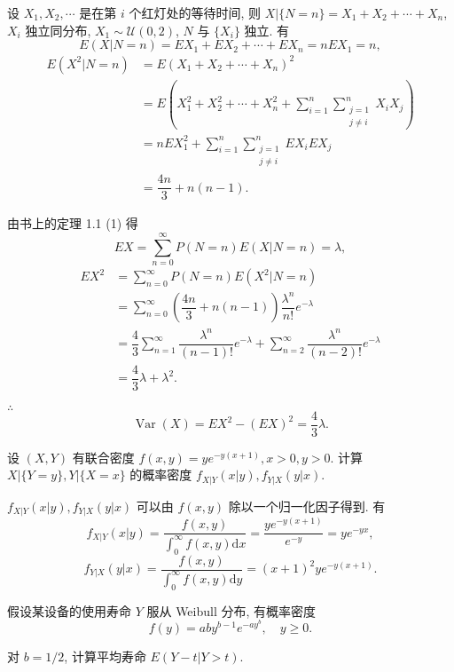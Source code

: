 \documentclass{ctexart}
\begin{document}
\begin{solution}
    设 $X_1,X_2,\cdots$ 是在第 $i$ 个红灯处的等待时间, 则 $X|\{N=n\}=X_1+X_2+\cdots+X_n$, $X_i$ 独立同分布, $X_1\sim\mathcal{U}(0,2)$, $N$ 与 $\{X_i\}$ 独立. 有
    \[E(X|N=n)=EX_1+EX_2+\cdots+EX_n=nEX_1=n,\]
    \begin{align*}
        E(X^2|N=n) & =E(X_1+X_2+\cdots+X_n)^2 \\
        & =E\left(X_1^2+X_2^2+\cdots+X_n^2+\sum\limits_{i=1}^n\sum\limits_{\substack{j=1\\j\neq i}}^nX_iX_j\right) \\
        & =nEX_1^2+\sum\limits_{i=1}^n\sum\limits_{\substack{j=1\\j\neq i}}^nEX_iEX_j \\
        & =\dfrac{4n}{3}+n(n-1).
    \end{align*}

    由书上的定理 1.1 (1) 得
    \[EX=\sum\limits_{n=0}^\infty P(N=n)E(X|N=n)=\lambda,\]
    \begin{align*}
        EX^2 & =\sum\limits_{n=0}^\infty P(N=n)E(X^2|N=n) \\
        & =\sum\limits_{n=0}^\infty\left(\dfrac{4n}{3}+n(n-1)\right)\dfrac{\lambda^n}{n!}e^{-\lambda}  \\
        & =\dfrac{4}{3}\sum\limits_{n=1}^\infty\dfrac{\lambda^n}{(n-1)!}e^{-\lambda}+\sum\limits_{n=2}^\infty\dfrac{\lambda^n}{(n-2)!}e^{-\lambda}  \\
        & =\dfrac{4}{3}\lambda+\lambda^2.
    \end{align*}

    $\therefore$
    \[\operatorname{Var}(X)=EX^2-(EX)^2=\dfrac{4}{3}\lambda.\]
\end{solution}
\addtocounter{exercise}{4}
\begin{exercise}%
    设 $(X,Y)$ 有联合密度 $f(x,y)=ye^{-y(x+1)},x>0,y>0$. 计算 $X|\{Y=y\},Y|\{X=x\}$ 的概率密度 $f_{X|Y}(x|y),f_{Y|X}(y|x)$.
\end{exercise}
\begin{solution}
    $f_{X|Y}(x|y),f_{Y|X}(y|x)$ 可以由 $f(x,y)$ 除以一个归一化因子得到. 有
    \[f_{X|Y}(x|y)=\dfrac{f(x,y)}{\int_0^\infty f(x,y)\mathrm{d}x}=\dfrac{ye^{-y(x+1)}}{e^{-y}}=ye^{-yx},\]
    \[f_{Y|X}(y|x)=\dfrac{f(x,y)}{\int_0^\infty f(x,y)\mathrm{d}y}=(x+1)^2ye^{-y(x+1)}.\]
\end{solution}
\addtocounter{exercise}{4}
\begin{exercise}%
    假设某设备的使用寿命 $Y$ 服从 Weibull 分布, 有概率密度
    \[f(y)=aby^{b-1}e^{-ay^b},\quad y\geq0.\]

    对 $b=1/2$, 计算平均寿命 $E(Y-t|Y>t)$.
\end{exercise}
\end{document}
